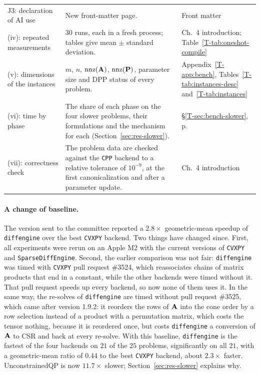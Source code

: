 \documentclass[letterpaper,12pt]{article}
\newcommand{\tsec}[1]{\S\ref{T-#1}}
\newcommand{\tpage}[1]{p.~\pageref{T-#1}}
\newcommand{\tref}[1]{\tsec{#1}, \tpage{#1}}
\begin{document}
{\begin{longtable}{>{\raggedright}p{} >{\raggedright}p{}
  >{\raggedright\arraybackslash}p{}}
J3: declaration of AI use
  & New front-matter page.
  & Front matter \\
(iv): repeated measurements
  & $30$ runs, each in a fresh process; tables give mean $\pm$ standard deviation.
  & Ch.~4 introduction; Table~\ref{T-tab:oneshot-compile} \\
(v): dimensions of the instances
  & $m$, $n$, $\mathrm{nnz}(\mathbf{A})$, $\mathrm{nnz}(\mathbf{P})$, parameter size and DPP
    status of every problem.
  & Appendix~\ref{T-app:bench}, Tables~\ref{T-tab:instances-desc} and~\ref{T-tab:instances} \\
(vi): time by phase
  & The share of each phase on the four slower problems, their formulations and the
    mechanism for each (Section~\ref{sec:res-slower}).
  & \tref{sec:bench-slower} \\
(vii): correctness check
  & The problem data are checked against the \texttt{CPP} backend to a relative tolerance of
    $10^{-9}$, at the first canonicalization and after a parameter update.
  & Ch.~4 introduction \\
\end{longtable}}

\paragraph{A change of baseline.}
The version sent to the committee reported a $2.8\times$ geometric-mean speedup of
\texttt{diffengine} over the best \texttt{CVXPY} backend. Two things have changed since. First,
all experiments were rerun on an Apple M2 with the current versions of \texttt{CVXPY} and
\texttt{SparseDiffEngine}. Second, the earlier comparison was not fair: \texttt{diffengine} was
timed with \texttt{CVXPY} pull request \#3524, which reassociates chains of matrix products that
end in a constant, while the other backends were timed without it. That pull request speeds up
every backend, so now none of them uses it. In the same way, the re-solves of
\texttt{diffengine} are timed without pull request \#3525, which came after version 1.9.2: it
reorders the rows of $\mathbf{A}$ into the cone order by a row selection instead of a product
with a permutation matrix, which costs the tensor nothing, because it is reordered once, but
costs \texttt{diffengine} a conversion of $\mathbf{A}$ to CSR and back at every re-solve.
With this baseline, \texttt{diffengine} is the fastest of the four backends on $21$ of the $25$
problems, significantly on all $21$, with a geometric-mean ratio of $0.44$ to the best
\texttt{CVXPY} backend, about $2.3\times$ faster. UnconstrainedQP is now $11.7\times$ slower;
Section~\ref{sec:res-slower} explains why.
\end{document}
